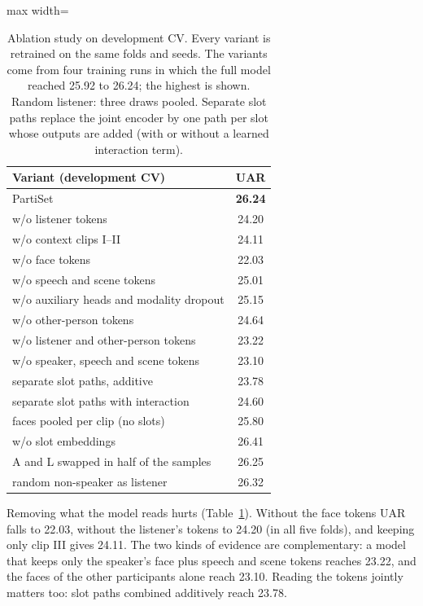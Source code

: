 \documentclass[11pt]{article}
\newcommand{\model}{PartiSet}
\begin{document}
\begin{table}[t]
\centering\small
\begin{adjustbox}{max width=\columnwidth}
\begin{tabular}{lc}
\toprule
Variant (development CV) & UAR \\
\midrule
\model{} & \textbf{26.24} \\
\midrule
\quad w/o listener tokens & 24.20 \\
\quad w/o context clips I--II & 24.11 \\
\quad w/o face tokens & 22.03 \\
\quad w/o speech and scene tokens & 25.01 \\
\quad w/o auxiliary heads and modality dropout & 25.15 \\
\midrule
\quad w/o other-person tokens & 24.64 \\
\quad w/o listener and other-person tokens & 23.22 \\
\quad w/o speaker, speech and scene tokens & 23.10 \\
\quad separate slot paths, additive & 23.78 \\
\quad separate slot paths with interaction & 24.60 \\
\midrule
\quad faces pooled per clip (no slots) & 25.80 \\
\quad w/o slot embeddings & 26.41 \\
\quad A and L swapped in half of the samples & 26.25 \\
\quad random non-speaker as listener & 26.32 \\
\bottomrule
\end{tabular}
\end{adjustbox}
\caption{Ablation study on development CV. Every variant is retrained on the same folds and seeds. The variants come
from four training runs in which the full model reached 25.92 to 26.24; the highest is shown. Random listener: three
draws pooled. Separate slot paths replace the joint encoder by one path per slot whose outputs are added (with or
without a learned interaction term).}
\label{tab:ablation}
\end{table}

Removing what the model reads hurts (Table~\ref{tab:ablation}). Without the face tokens UAR falls to 22.03, without the
listener's tokens to 24.20 (in all five folds), and keeping only clip III gives 24.11. The two kinds of evidence are
complementary: a model that keeps only the speaker's face plus speech and scene tokens reaches 23.22, and the faces of
the other participants alone reach 23.10. Reading the tokens jointly matters too: slot paths combined additively reach
23.78.
\end{document}
